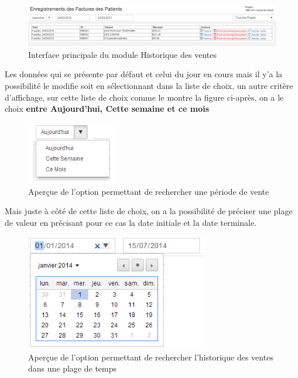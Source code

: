 \documentclass[12pt,a4paper]{report}
\begin{document}
\begin{figure}[h]
\begin{center}
\includegraphics[width=14cm]{pic/HistoVente.png}
\end{center}
\caption{Interface principale du module Historique des ventes}
\label{Interface principale du module Historique des ventes}
\end{figure}

Les données qui se présente par défaut et celui du jour en cours mais il y'a la possibilité le modifie soit en sélectionnant dans la liste de choix, un autre critère d'affichage, sur cette liste de choix comme le montre la figure ci-après, on a le choix \textbf{entre Aujourd'hui, Cette semaine et ce mois} 


\begin{figure}[h]
\begin{center}
\includegraphics[width=4cm]{pic/SelectJour.png}
\end{center}
\caption{Aperçue de l'option permettant de rechercher une période de vente}
\label{Aperçue de l'option permettant de rechercher une période de vente}
\end{figure}

Mais juste à côté de cette liste de choix, on a la possibilité de préciser une plage de valeur en précisant pour ce cas la date initiale et la date terminale.

\begin{figure}[h]
\begin{center}
\includegraphics[width=8cm]{pic/SelectPlageValeur.png}
\end{center}
\caption{Aperçue de l'option permettant de rechercher l'historique des ventes dans une plage de temps}
\label{Aperçue de l'option permettant de rechercher l'historique des ventes dans une plage de temps}
\end{figure}
\end{document}
